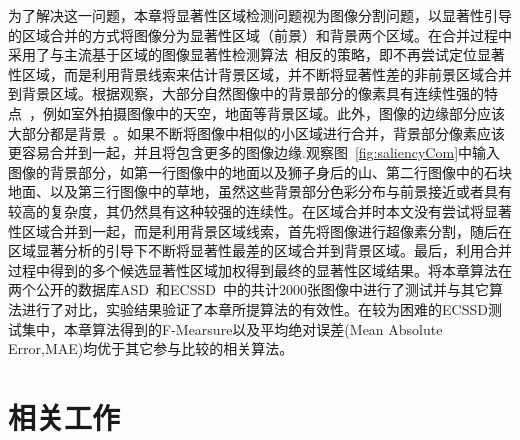 \par
为了解决这一问题，本章将显著性区域检测问题视为图像分割问题，以显著性引导的区域合并的方式将图像分为显著性区域（前景）和背景两个区域。在合并过程中采用了与主流基于区域的图像显著性检测算法~\cite{Achanta08,ChengPAMI,ufo,Yan2014Hierarchical}相反的策略，即不再尝试定位显著性区域，而是利用背景线索来估计背景区域，并不断将显著性差的非前景区域合并到背景区域。根据观察，大部分自然图像中的背景部分的像素具有连续性强的特点~\cite{huamiao}，例如室外拍摄图像中的天空，地面等背景区域。此外，图像的边缘部分应该大部分都是背景~\cite{backgroundPrior}。如果不断将图像中相似的小区域进行合并，背景部分像素应该更容易合并到一起，并且将包含更多的图像边缘.观察图~\ref{fig:saliencyCom}中输入图像的背景部分，如第一行图像中的地面以及狮子身后的山、第二行图像中的石块地面、以及第三行图像中的草地，虽然这些背景部分色彩分布与前景接近或者具有较高的复杂度，其仍然具有这种较强的连续性。在区域合并时本文没有尝试将显著性区域合并到一起，而是利用背景区域线索，首先将图像进行超像素分割，随后在区域显著分析的引导下不断将显著性最差的区域合并到背景区域。最后，利用合并过程中得到的多个候选显著性区域加权得到最终的显著性区域结果。将本章算法在两个公开的数据库ASD~\cite{Achanta08}和ECSSD~\cite{ECSSD}中的共计2000张图像中进行了测试并与其它算法进行了对比，实验结果验证了本章所提算法的有效性。在较为困难的ECSSD测试集中，本章算法得到的F-Mearsure以及平均绝对误差(Mean Absolute Error,MAE)均优于其它参与比较的相关算法。

\section{相关工作}
\label{sec:relatedWorks}
